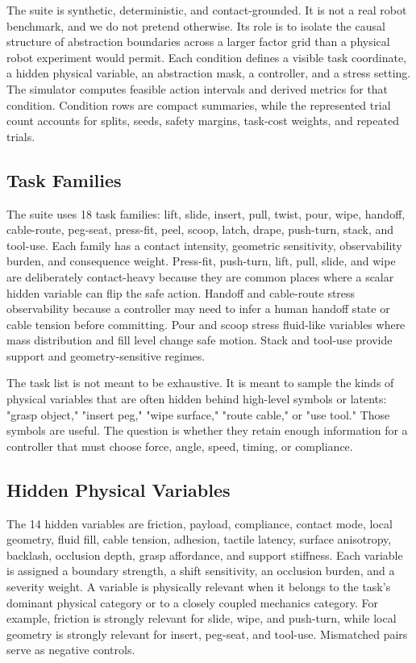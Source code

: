 \documentclass{article}
\begin{document}
The suite is synthetic, deterministic, and contact-grounded. It is not a real
robot benchmark, and we do not pretend otherwise. Its role is to isolate the
causal structure of abstraction boundaries across a larger factor grid than a
physical robot experiment would permit. Each condition defines a visible task
coordinate, a hidden physical variable, an abstraction mask, a controller, and a
stress setting. The simulator computes feasible action intervals and derived
metrics for that condition. Condition rows are compact summaries, while the
represented trial count accounts for splits, seeds, safety margins, task-cost
weights, and repeated trials.



\subsection{Task Families}

The suite uses 18 task families: lift, slide, insert, pull, twist, pour, wipe,
handoff, cable-route, peg-seat, press-fit, peel, scoop, latch, drape, push-turn,
stack, and tool-use. Each family has a contact intensity, geometric sensitivity,
observability burden, and consequence weight. Press-fit, push-turn, lift, pull,
slide, and wipe are deliberately contact-heavy because they are common places
where a scalar hidden variable can flip the safe action. Handoff and cable-route
stress observability because a controller may need to infer a human handoff state
or cable tension before committing. Pour and scoop stress fluid-like variables
where mass distribution and fill level change safe motion. Stack and tool-use
provide support and geometry-sensitive regimes.

The task list is not meant to be exhaustive. It is meant to sample the kinds of
physical variables that are often hidden behind high-level symbols or latents:
"grasp object," "insert peg," "wipe surface," "route cable," or "use tool."
Those symbols are useful. The question is whether they retain enough information
for a controller that must choose force, angle, speed, timing, or compliance.

\subsection{Hidden Physical Variables}

The 14 hidden variables are friction, payload, compliance, contact mode, local
geometry, fluid fill, cable tension, adhesion, tactile latency, surface
anisotropy, backlash, occlusion depth, grasp affordance, and support stiffness.
Each variable is assigned a boundary strength, a shift sensitivity, an occlusion
burden, and a severity weight. A variable is physically relevant when it belongs
to the task's dominant physical category or to a closely coupled mechanics
category. For example, friction is strongly relevant for slide, wipe, and
push-turn, while local geometry is strongly relevant for insert, peg-seat, and
tool-use. Mismatched pairs serve as negative controls.
\end{document}
